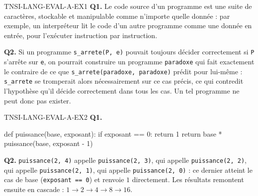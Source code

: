 \begin{corrige}{TNSI-LANG-EVAL-A-EX1}
\textbf{Q1.} Le code source d'un programme est une suite de caractères, stockable et manipulable comme n'importe quelle donnée : par exemple, un interpréteur lit le code d'un autre programme comme une donnée en entrée, pour l'exécuter instruction par instruction.

\textbf{Q2.} Si un programme \lstinline{s_arrete(P, e)} pouvait toujours décider correctement si \lstinline{P} s'arrête sur \lstinline{e}, on pourrait construire un programme \lstinline{paradoxe} qui fait exactement le contraire de ce que \lstinline{s_arrete(paradoxe, paradoxe)} prédit pour lui-même : \lstinline{s_arrete} se tromperait alors nécessairement sur ce cas précis, ce qui contredit l'hypothèse qu'il décide correctement dans tous les cas. Un tel programme ne peut donc pas exister.
\end{corrige}

\begin{corrige}{TNSI-LANG-EVAL-A-EX2}
\textbf{Q1.}
\begin{python}
def puissance(base, exposant):
    if exposant == 0:
        return 1
    return base * puissance(base, exposant - 1)
\end{python}

\textbf{Q2.} \lstinline{puissance(2, 4)} appelle \lstinline{puissance(2, 3)}, qui appelle \lstinline{puissance(2, 2)}, qui appelle \lstinline{puissance(2, 1)}, qui appelle \lstinline{puissance(2, 0)} : ce dernier atteint le cas de base (\lstinline{exposant == 0}) et renvoie $1$ directement. Les résultats remontent ensuite en cascade : $1 \to 2 \to 4 \to 8 \to 16$.
\end{corrige}
